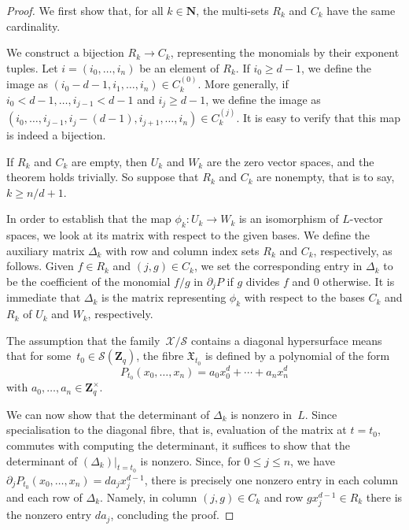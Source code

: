 \documentclass[a4paper,11pt]{article}
\numberwithin{equation}{section}
\newcommand{\NN}{\mathbf{N}} %
\newcommand{\ZZ}{\mathbf{Z}} %
\renewcommand{\to}{\rightarrow}        %
\theoremstyle{definition}
\begin{document}
\begin{proof}
We first show that, for all $k \in \NN$, the multi-sets $R_k$ and $C_k$ 
have the same cardinality.

We construct a bijection $R_k \to C_k$, representing the 
monomials by their exponent tuples.  Let $i = (i_0, \dotsc, i_n)$ be an
element of $R_k$.  If $i_0 \geq d-1$, we define the image as
$(i_0-d-1, i_1, \dotsc, i_n) \in C_k^{(0)}$.  More generally, if 
$i_0 < d-1, \dotsc, i_{j-1} < d-1$ and $i_j \geq d-1$, we define the image as 
$(i_0, \dotsc, i_{j-1}, i_j-(d-1), i_{j+1}, \dotsc, i_n) \in C_k^{(j)}$.  
It is easy to verify that this map is indeed a bijection.

If $R_k$ and $C_k$ are empty, then $U_k$ and $W_k$ are the zero vector spaces, 
and the theorem holds trivially. So suppose that $R_k$ and $C_k$ are nonempty, 
that is to say, $k \geq n/d + 1$.

In order to establish that the map $\phi_k \colon U_k \to W_k$ is an 
isomorphism of $L$-vector spaces, we look at its matrix with respect to 
the given bases.   We define the auxiliary matrix $\Delta_k$ with 
row and column index sets $R_k$ and $C_k$, respectively, as follows.  
Given $f \in R_k$ and $(j,g) \in C_k$, we set the corresponding entry in 
$\Delta_k$ to be the coefficient of the monomial $f/g$ in $\partial_j P$ if 
$g$ divides $f$ and $0$ otherwise. It is immediate that $\Delta_k$ is the 
matrix representing $\phi_k$ with respect to the bases $C_k$ and $R_k$ of 
$U_k$ and $W_k$, respectively.

The assumption that the family~$\mathcal{X}/\mathcal{S}$ contains a diagonal 
hypersurface means that for some~$t_0 \in \mathcal{S}(\ZZ_q)$, 
the fibre $\mathfrak{X}_{t_0}$ is defined by a polynomial of the form 
\begin{equation*}
P_{t_0}(x_0, \dotsc, x_n) = a_0 x_0^d + \dotsb + a_n x_n^d
\end{equation*}
with $a_0, \dotsc, a_n \in \ZZ_q^{\times}$.

We can now show that the determinant of $\Delta_k$ is nonzero in~$L$.  Since 
specialisation to the diagonal fibre, that is, evaluation of the matrix at 
$t = t_0$, commutes with computing the determinant, it suffices to show that 
the determinant of $(\Delta_k) \big |_{t=t_0}$ is nonzero.  Since, for 
$0 \leq j \leq n$, we have $\partial_j P_{t_0} (x_0, \dotsc, x_n) = d a_j x_j^{d-1}$, 
there is precisely one nonzero entry in each column and each row of $\Delta_k$.  
Namely, in column $(j, g) \in C_k$ and row $g x_j^{d-1} \in R_k$ there is the 
nonzero entry $d a_j$, concluding the proof.
\end{proof}
\end{document}
